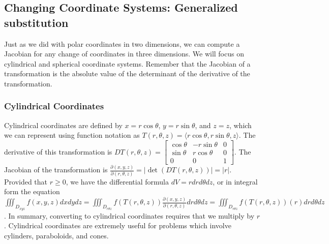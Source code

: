 \subsection{Changing Coordinate Systems: Generalized substitution}
%
Just as we did with polar coordinates in two dimensions, we can
compute a Jacobian for any change of coordinates in three dimensions.
We will focus on cylindrical and spherical coordinate systems.
Remember that the Jacobian of a transformation is the absolute value
of the determinant of the derivative of the transformation.

\subsubsection{Cylindrical Coordinates}
Cylindrical coordinates are defined by $x=r\cos\theta$, $y=r\sin\theta$, and
$z=z$, which we can represent using function notation as
$T(r,\theta,z)=\langle r\cos\theta, r\sin\theta,z\rangle$. The derivative of this transformation
is 
$DT(r,\theta,z)= 
\begin{bmatrix}
\cos\theta&-r\sin\theta&0\\
\sin\theta&r\cos\theta&0\\
0&0&1
\end{bmatrix}$. The Jacobian of the transformation is
$\frac{\partial(x,y,z)}{\partial(r,\theta,z)} = |\det(DT(r,\theta,z))| = |r|$. Provided that
$r\geq 0$, we have the differential formula $dV=rdrd\theta dz$, or in integral
form the equation $\iiint_{D_{xyz}} f(x,y,z)dxdydz = \iiint_{D_{r\theta z}}
f(T(r,\theta,z))\frac{\partial(x,y,z)}{\partial(r,\theta,z)}drd\theta dz=  \iiint_{D_{r\theta z}}
f(T(r,\theta,z))(r)drd\theta dz $. In summary, converting to cylindrical
coordinates requires that we multiply by $r$. Cylindrical coordinates
are extremely useful for problems which involve cylinders,
paraboloids, and cones. 

